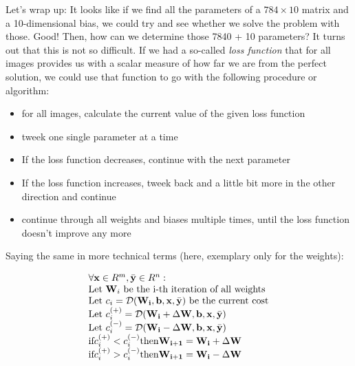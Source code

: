 \documentclass[]{report}
\begin{document}
\bigskip

Let's wrap up: It looks like if we find all the parameters of a \(784 \times 10 \) matrix and a 10-dimensional bias, we could try and see whether we solve the problem with those. Good! Then, how can we determine those 7840 + 10 parameters? It turns out that this is not so difficult. If we had a so-called \emph{loss function} that for all images provides us with a scalar measure of how far we are from the perfect solution, we could use that function to go with the following procedure or algorithm:

\begin{itemize}
\item for all images, calculate the current value of the given loss function
\item tweek one single parameter at a time
\item If the loss function decreases, continue with the next parameter
\item If the loss function increases, tweek back and a little bit more in the other direction and continue
\item continue through all weights and biases multiple times, until the loss function doesn't improve any more
\end{itemize}

Saying the same in more technical terms (here, exemplary only for the weights):

\begin{equation} \label{algo}
\begin{array}{l l l}
\forall \mathbf{x} \in R^m, \bar{\mathbf{y}} \in R^n: \\
\textrm{Let } \mathbf{W}_i \textrm{ be the i-th iteration of all weights} \\
\textrm{Let } c_i = \mathcal{D}(\mathbf{W_i}, \mathbf{b},  \mathbf{x}, \bar{\mathbf{y}}) \textrm{ be the current cost}\\
\textrm{Let } c_i^{(+)} = \mathcal{D}(\mathbf{W_i}+\Delta\mathbf{W}, \mathbf{b},  \mathbf{x}, \bar{\mathbf{y}}) \\
\textrm{Let } c_i^{(-)} = \mathcal{D}(\mathbf{W_i}-\Delta\mathbf{W}, \mathbf{b},  \mathbf{x}, \bar{\mathbf{y}}) \\
\textrm{if} c_i^{(+)} < c_i^{(-)} \textrm{then} \mathbf{W_{i+1}}=\mathbf{W_i}+\Delta\mathbf{W} \\
\textrm{if} c_i^{(+)} > c_i^{(-)} \textrm{then} \mathbf{W_{i+1}}=\mathbf{W_i}-\Delta\mathbf{W}
\end{array}
\end{equation}
\end{document}
